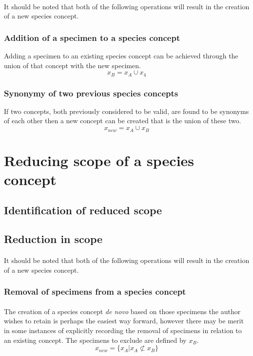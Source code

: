 \documentclass{article}
\begin{document}
   \paragraph{}
   It should be noted that both of the following operations will result in the creation of a new species concept.
   \subsubsection{Addition of a specimen to a species concept}
   Adding a specimen to an existing species concept can be achieved through the union of that concept with the new specimen.
   \[x_B = x_A \cup x_4\]
   
   \subsubsection{Synonymy of two previous species concepts}
   If two concepts, both previously considered to be valid, are found to be synonyms of each other then a new concept can be created that is the union of these two.
   \[x_{new}=x_A \cup x_B\]
   
   \section{Reducing scope of a species concept}
   \subsection{Identification of reduced scope}
   \subsection{Reduction in scope}
   \paragraph{}
   It should be noted that both of the following operations will result in the creation of a new species concept.
   \subsubsection{Removal of specimens from a species concept}
   \paragraph{}
   The creation of a species concept \textit{de novo} based on those specimens the author wishes to retain is perhaps the easiest way forward, however there may be merit in some instances of explicitly recording the removal of specimens in relation to an existing concept. The specimens to exclude are defined by $x_B$.
   \[x_{new} = \{x_A|x_A \not\subset x_B\}\] 
\end{document}
